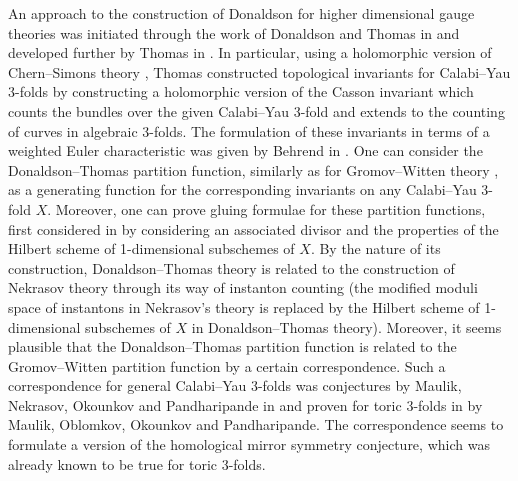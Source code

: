 \documentclass[11pt,colorinlistoftodos]{amsart}
\numberwithin{equation}{subsection}
\theoremstyle{plain}
\theoremstyle{definition}
\theoremstyle{remark}
\begin{document}
An approach to the construction of Donaldson for higher dimensional gauge theories was initiated through the work of Donaldson and Thomas in \cite{DonaldsonThomas1998} and developed further by Thomas in \cite{Thomas2000}. In particular, using a holomorphic version of Chern--Simons theory \cite{Chern1974}, Thomas constructed topological invariants for Calabi--Yau 3-folds by constructing a holomorphic version of the Casson invariant \cite{Saveliev1999} which counts the bundles over the given Calabi--Yau 3-fold and extends to the counting of curves in algebraic 3-folds. The formulation of these invariants in terms of a weighted Euler characteristic was given by Behrend in \cite{Behrend2009}. One can consider the Donaldson--Thomas partition function, similarly as for Gromov--Witten theory \cite{Witten1991,Behrend1997}, as a generating function for the corresponding invariants on any Calabi--Yau 3-fold $X$. Moreover, one can prove gluing formulae for these partition functions, first considered in \cite{LiWu2015} by considering an associated divisor and the properties of the Hilbert scheme of 1-dimensional subschemes of $X$. By the nature of its construction, Donaldson--Thomas theory is related to the construction of Nekrasov theory through its way of instanton counting (the modified moduli space of instantons in Nekrasov's theory is replaced by the Hilbert scheme of 1-dimensional subschemes of $X$ in Donaldson--Thomas theory). 
Moreover, it seems plausible that the Donaldson--Thomas partition function is related to the Gromov--Witten partition function by a certain correspondence. Such a correspondence for general Calabi--Yau 3-folds was conjectures by Maulik, Nekrasov, Okounkov and Pandharipande in \cite{MaulikNekreasovOkounkovPandharipande2006_1,MaulikNekreasovOkounkovPandharipande2006_2} and proven for toric 3-folds in \cite{MaulikOblomkovOkounkovPandharipande2011} by Maulik, Oblomkov, Okounkov and Pandharipande. The correspondence seems to formulate a version of the homological mirror symmetry conjecture, which was already known to be true for toric 3-folds. 
\end{document}
